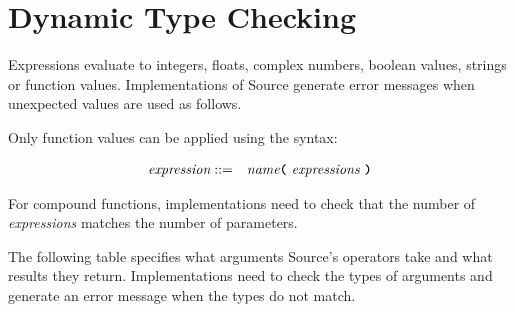 
\section{Dynamic Type Checking}

Expressions evaluate to integers, floats, complex numbers, boolean values, strings or function values. 
Implementations of Source generate error messages when unexpected values are used as follows.

Only function values can be applied using the syntax:

\begin{eqnarray*}
 \textit{expression}    
                                   & ::=   &  \textit{name}
                                               \texttt{\textbf{(}}\  \textit{expressions} \
                                               \texttt{\textbf{)}}\\ 
\end{eqnarray*}

For compound functions, implementations need to check that the number of \textit{expressions}
matches the number of parameters.

The following table specifies what arguments Source's operators
take and what results they return. Implementations need to check the types of arguments and
generate an error message when the types do not match.

